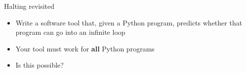 \begin{frame}{Halting revisited}
	\begin{itemize}
		\pause\item Write a software tool that, given a Python program, predicts whether that program can go into an infinite loop
		\pause\item Your tool must work for \textbf{all} Python programs
		\pause\item Is this possible?
	\end{itemize}
\end{frame}
